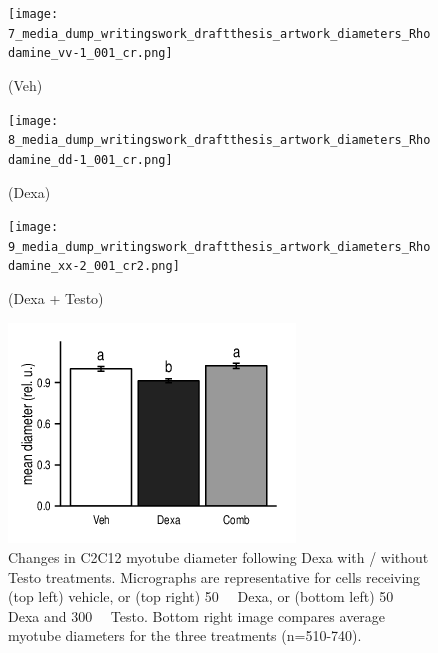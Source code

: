 \documentclass[12pt,english]{report}\usepackage[]{graphicx}\usepackage[]{color}
\newenvironment{knitrout}{}{} %
\begin{document}
\begin{figure}
\begin{minipage}[t][2.3in][c]{3in}%
\texttt{[image: 7\_media\_dump\_writingswork\_draftthesis\_artwork\_diameters\_Rhodamine\_vv-1\_001\_cr.png]}

(Veh)%
\end{minipage}%
\begin{minipage}[t][2.3in][c]{3in}%
\texttt{[image: 8\_media\_dump\_writingswork\_draftthesis\_artwork\_diameters\_Rhodamine\_dd-1\_001\_cr.png]}

(Dexa)%
\end{minipage}

\begin{minipage}[t][2.3in][c]{3in}%
\texttt{[image: 9\_media\_dump\_writingswork\_draftthesis\_artwork\_diameters\_Rhodamine\_xx-2\_001\_cr2.png]}

(Dexa + Testo)%
\end{minipage}%
\begin{minipage}[t][2.2in][c]{6in}%
\begin{knitrout}
\color{fgcolor}
\includegraphics[width=3in,height=2.3in]{figure/celldiams-1} 

\end{knitrout}
%
\end{minipage}

\protect\caption[Changes in C2C12 myotube diameter following Dexa with / without Testo
treatments.]{Changes in C2C12 myotube diameter following Dexa with / without Testo
treatments. Micrographs are representative for cells receiving (top
left) vehicle, or (top right) \SI{50}{\micro\molar} Dexa, or (bottom
left) \SI{50}{\micro\molar} Dexa and \SI{300}{\nano\molar} Testo.
Bottom right image compares average myotube diameters for the three
treatments (n=510-740).\label{fig:myotube-diameters}}
\end{figure}
\end{document}
